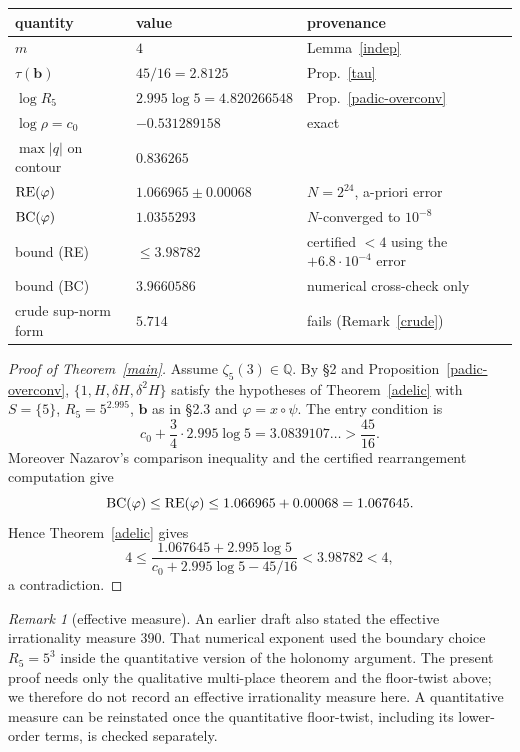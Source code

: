 \documentclass[11pt]{amsart}
\theoremstyle{remark}
\newtheorem{remark}[theorem]{Remark}
\newcommand{\Q}{\mathbb Q}\newcommand{\Z}{\mathbb Z}\newcommand{\R}{\mathbb R}\newcommand{\C}{\mathbb C}
\begin{document}
\begin{center}\small
\begin{tabular}{lll}\toprule
quantity & value & provenance\\\midrule
$m$ & $4$ & Lemma~\ref{indep}\\
$\tau(\mathbf b)$ & $45/16=2.8125$ & Prop.~\ref{tau}\\
$\log R_5$ & $2.995\log5=4.820266548$ & Prop.~\ref{padic-overconv}\\
$\log\rho=c_0$ & $-0.531289158$ & exact\\
$\max|q|$ on contour & $0.836265$ & \\
$\mathrm{RE}(\varphi)$ & $1.066965\pm0.00068$ & $N=2^{24}$, a-priori error\\
$\mathrm{BC}(\varphi)$ & $1.0355293$ & $N$-converged to $10^{-8}$\\
bound (RE) & $\le3.98782$ & certified $<4$ using the $+6.8\cdot10^{-4}$ error\\
bound (BC) & $3.9660586$ & numerical cross-check only\\
crude sup-norm form & $5.714$ & fails (Remark~\ref{crude})\\\bottomrule
\end{tabular}
\end{center}

\begin{proof}[Proof of Theorem~\ref{main}]
Assume $\zeta_5(3)\in\Q$. By \S2 and Proposition~\ref{padic-overconv}, $\{1,H,\delta H,\delta^2H\}$ satisfy the hypotheses of Theorem~\ref{adelic} with $S=\{5\}$, $R_5=5^{2.995}$, $\mathbf b$ as in \S2.3 and $\varphi=x\circ\psi$. The entry condition is
\[c_0+\frac34\cdot2.995\log5=3.0839107\ldots>\frac{45}{16}.
\]
Moreover Nazarov's comparison inequality \cite[Prop.~8.1.13]{CDTl2chi} and the certified rearrangement computation give
\[\mathrm{BC}(\varphi)\le\mathrm{RE}(\varphi)\le1.066965+0.00068=1.067645.
\]
Hence Theorem~\ref{adelic} gives
\[
4\le
\frac{1.067645+2.995\log5}
     {c_0+2.995\log5-45/16}
<3.98782<4,
\]
a contradiction.
\end{proof}

\begin{remark}[effective measure]
An earlier draft also stated the effective irrationality measure $390$. That numerical exponent used the boundary choice $R_5=5^3$ inside the quantitative version of the holonomy argument. The present proof needs only the qualitative multi-place theorem and the floor-twist above; we therefore do not record an effective irrationality measure here. A quantitative measure can be reinstated once the quantitative floor-twist, including its lower-order terms, is checked separately.
\end{remark}
\end{document}
